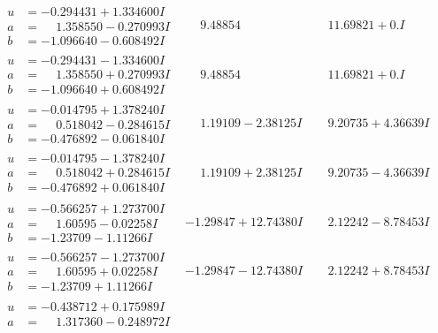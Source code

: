 \documentclass[1p]{elsarticle_modified}
\theoremstyle{definition}
\begin{document}
$$\begin{array}{c|c|c}
\begin{aligned}
u &= -0.294431 + 1.334600 I \\
a &= \phantom{-}1.358550 - 0.270993 I \\
b &= -1.096640 - 0.608492 I\end{aligned}
 & \phantom{-}9.48854\phantom{ +0.000000I} & \phantom{-}11.69821 + 0. I\phantom{ +0.000000I} \\ \hline\begin{aligned}
u &= -0.294431 - 1.334600 I \\
a &= \phantom{-}1.358550 + 0.270993 I \\
b &= -1.096640 + 0.608492 I\end{aligned}
 & \phantom{-}9.48854\phantom{ +0.000000I} & \phantom{-}11.69821 + 0. I\phantom{ +0.000000I} \\ \hline\begin{aligned}
u &= -0.014795 + 1.378240 I \\
a &= \phantom{-}0.518042 - 0.284615 I \\
b &= -0.476892 - 0.061840 I\end{aligned}
 & \phantom{-}1.19109 - 2.38125 I & \phantom{-}9.20735 + 4.36639 I \\ \hline\begin{aligned}
u &= -0.014795 - 1.378240 I \\
a &= \phantom{-}0.518042 + 0.284615 I \\
b &= -0.476892 + 0.061840 I\end{aligned}
 & \phantom{-}1.19109 + 2.38125 I & \phantom{-}9.20735 - 4.36639 I \\ \hline\begin{aligned}
u &= -0.566257 + 1.273700 I \\
a &= \phantom{-}1.60595 - 0.02258 I \\
b &= -1.23709 - 1.11266 I\end{aligned}
 & -1.29847 + 12.74380 I & \phantom{-}2.12242 - 8.78453 I \\ \hline\begin{aligned}
u &= -0.566257 - 1.273700 I \\
a &= \phantom{-}1.60595 + 0.02258 I \\
b &= -1.23709 + 1.11266 I\end{aligned}
 & -1.29847 - 12.74380 I & \phantom{-}2.12242 + 8.78453 I \\ \hline\begin{aligned}
u &= -0.438712 + 0.175989 I \\
a &= \phantom{-}1.317360 - 0.248972 I \\

\end{aligned}
\end{array}$$
\end{document}

